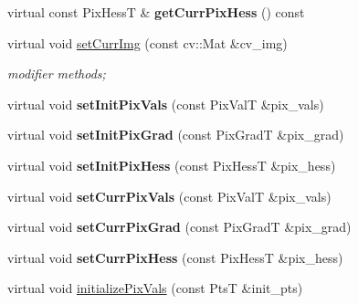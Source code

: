 \begin{DoxyCompactItemize}
\item 
\hypertarget{classImageBase_a7793589a55eff60418443f6dca953f05}{virtual const Pix\-Hess\-T \& {\bfseries get\-Curr\-Pix\-Hess} () const }\label{classImageBase_a7793589a55eff60418443f6dca953f05}

\item 
\hypertarget{classImageBase_a9eb8fba660685c2a74b2cf2658b103ed}{virtual void \hyperlink{classImageBase_a9eb8fba660685c2a74b2cf2658b103ed}{set\-Curr\-Img} (const cv\-::\-Mat \&cv\-\_\-img)}\label{classImageBase_a9eb8fba660685c2a74b2cf2658b103ed}

\begin{DoxyCompactList}\small\item\em modifier methods; \end{DoxyCompactList}\item 
\hypertarget{classImageBase_a8d50bae23e438e75a51cc6d38a0cb933}{virtual void {\bfseries set\-Init\-Pix\-Vals} (const Pix\-Val\-T \&pix\-\_\-vals)}\label{classImageBase_a8d50bae23e438e75a51cc6d38a0cb933}

\item 
\hypertarget{classImageBase_aadecea7cb19c93e5b0558f219344c599}{virtual void {\bfseries set\-Init\-Pix\-Grad} (const Pix\-Grad\-T \&pix\-\_\-grad)}\label{classImageBase_aadecea7cb19c93e5b0558f219344c599}

\item 
\hypertarget{classImageBase_a0c74c497e73154bfc99c3fe3790b138c}{virtual void {\bfseries set\-Init\-Pix\-Hess} (const Pix\-Hess\-T \&pix\-\_\-hess)}\label{classImageBase_a0c74c497e73154bfc99c3fe3790b138c}

\item 
\hypertarget{classImageBase_a63fe6a4acb201ee9418a96e28dbabc14}{virtual void {\bfseries set\-Curr\-Pix\-Vals} (const Pix\-Val\-T \&pix\-\_\-vals)}\label{classImageBase_a63fe6a4acb201ee9418a96e28dbabc14}

\item 
\hypertarget{classImageBase_a0f8d3b81eca127f6094b2804d2155905}{virtual void {\bfseries set\-Curr\-Pix\-Grad} (const Pix\-Grad\-T \&pix\-\_\-grad)}\label{classImageBase_a0f8d3b81eca127f6094b2804d2155905}

\item 
\hypertarget{classImageBase_a123a6ed44636823f12e9b49abdd80c99}{virtual void {\bfseries set\-Curr\-Pix\-Hess} (const Pix\-Hess\-T \&pix\-\_\-hess)}\label{classImageBase_a123a6ed44636823f12e9b49abdd80c99}

\item 
\hypertarget{classImageBase_ab803d031b7ed046b00e69d691504e14e}{virtual void \hyperlink{classImageBase_ab803d031b7ed046b00e69d691504e14e}{initialize\-Pix\-Vals} (const Pts\-T \&init\-\_\-pts)}\label{classImageBase_ab803d031b7ed046b00e69d691504e14e}


\end{DoxyCompactItemize}
